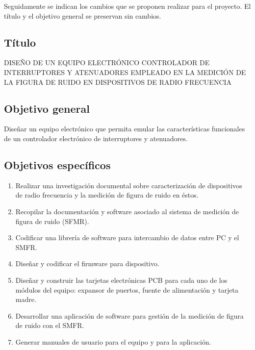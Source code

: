 \documentclass[paper=letter,oneside,fontsize=10pt]{article}
\begin{document}
	Seguidamente se indican los cambios que se proponen realizar para el proyecto. El título y el objetivo general se preservan sin cambios.
	
	\subsection{Título}
	
	\begin{minipage}{0.95\textwidth}
		\centering
		DISEÑO DE UN EQUIPO ELECTRÓNICO CONTROLADOR DE INTERRUPTORES Y ATENUADORES EMPLEADO EN LA MEDICIÓN DE LA FIGURA DE RUIDO EN DISPOSITIVOS DE RADIO FRECUENCIA
	\end{minipage}
	
	\subsection{Objetivo general}
	
	\begin{minipage}{0.95\textwidth}
		Diseñar un equipo electrónico que permita emular las características funcionales de un controlador electrónico de interruptores y atenuadores.
	\end{minipage}
	
	\subsection{Objetivos específicos}	
	
	\begin{enumerate}
		\item Realizar una investigación documental sobre caracterización de dispositivos de radio frecuencia y la medición de figura de ruido en éstos.
		
		\item Recopilar la documentación y software asociado al sistema de medición de figura de ruido (SFMR).
		
		\item Codificar una librería de software para intercambio de datos entre PC y el SMFR.
		
		\item Diseñar y codificar el firmware para dispositivo.
		
		\item Diseñar y construir las tarjetas electrónicas PCB para cada uno de los módulos del equipo: expansor de puertos, fuente de alimentación y tarjeta madre.
		
		\item Desarrollar una aplicación de software para gestión de la medición de figura de ruido con el SMFR.
		
		\item Generar manuales de usuario para el equipo y para la aplicación.
	\end{enumerate}	
	
\end{document}
